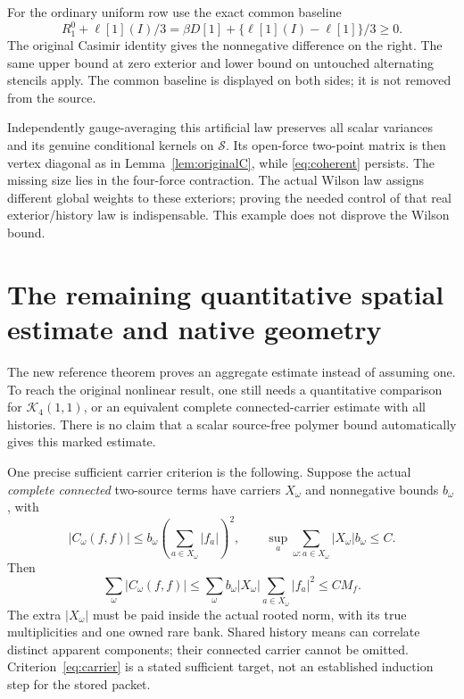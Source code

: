 \documentclass[11pt,letterpaper]{article}
\theoremstyle{remark}\newtheorem{remark}[theorem]{Remark}
\newcommand{\cK}{\mathcal K}\newcommand{\cC}{\mathcal C}
\begin{document}
For the ordinary uniform row use the exact common baseline
\[
 R_1^0+\ell[1](I)/3=\beta D[1]+\{\ell[1](I)-\ell[1]\}/3\ge0.
\]
The original Casimir identity gives the nonnegative difference on the right. The same upper bound at zero exterior and lower bound on untouched alternating stencils apply. The common baseline is displayed on both sides; it is not removed from the source.

Independently gauge-averaging this artificial law preserves all scalar variances and its genuine conditional kernels on \(\mathcal S\). Its open-force two-point matrix is then vertex diagonal as in Lemma~\ref{lem:originalC}, while \eqref{eq:coherent} persists. The missing size lies in the four-force contraction. The actual Wilson law assigns different global weights to these exteriors; proving the needed control of that real exterior/history law is indispensable. This example does not disprove the Wilson bound.

\section{The remaining quantitative spatial estimate and native geometry}

The new reference theorem proves an aggregate estimate instead of assuming one. To reach the original nonlinear result, one still needs a quantitative comparison for \(\cK_4(1,1)\), or an equivalent complete connected-carrier estimate with all histories. There is no claim that a scalar source-free polymer bound automatically gives this marked estimate.

One precise sufficient carrier criterion is the following. Suppose the actual \emph{complete connected} two-source terms have carriers \(X_\omega\) and nonnegative bounds \(b_\omega\), with
\begin{equation}\label{eq:carrier}
 |C_\omega(f,f)|\le b_\omega\left(\sum_{a\in X_\omega}|f_a|\right)^2,
 \qquad
 \sup_a\sum_{\omega:a\in X_\omega}|X_\omega|b_\omega\le C.
\end{equation}
Then
\[
 \sum_\omega|C_\omega(f,f)|
 \le\sum_\omega b_\omega|X_\omega|\sum_{a\in X_\omega}|f_a|^2
 \le CM_f.
\]
The extra \(|X_\omega|\) must be paid inside the actual rooted norm, with its true multiplicities and one owned rare bank. Shared history means can correlate distinct apparent components; their connected carrier cannot be omitted. Criterion~\eqref{eq:carrier} is a stated sufficient target, not an established induction step for the stored packet.
\end{document}
